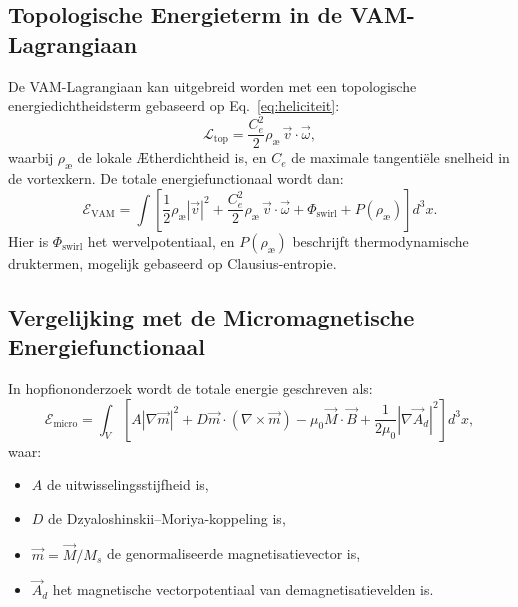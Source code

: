 \subsection{Topologische Energieterm in de VAM-Lagrangiaan}

De VAM-Lagrangiaan kan uitgebreid worden met een topologische energiedichtheidsterm gebaseerd op Eq.~\eqref{eq:heliciteit}:
\begin{equation}
    \mathcal{L}_\text{top} = \frac{C_e^2}{2} \rho_\text{\ae} \, \vec{v} \cdot \vec{\omega},
\end{equation}
waarbij $\rho_\text{\ae}$ de lokale Ætherdichtheid is, en $C_e$ de maximale tangentiële snelheid in de vortexkern. De totale energiefunctionaal wordt dan:
\begin{equation}
    \mathcal{E}_\text{VAM} = \int \left[
                                        \frac{1}{2} \rho_\text{\ae} |\vec{v}|^2
        + \frac{C_e^2}{2} \rho_\text{\ae} \, \vec{v} \cdot \vec{\omega}
                                        + \Phi_\text{swirl} + P(\rho_\text{\ae})
    \right] d^3x.
\end{equation}
Hier is $\Phi_\text{swirl}$ het wervelpotentiaal, en $P(\rho_\text{\ae})$ beschrijft thermodynamische druktermen, mogelijk gebaseerd op Clausius-entropie.

\subsection{Vergelijking met de Micromagnetische Energiefunctionaal}

In hopfiononderzoek wordt de totale energie geschreven als:
\begin{equation}
    \mathcal{E}_\text{micro} = \int_V \left[
                                            A |\nabla \vec{m}|^2 + D \vec{m} \cdot (\nabla \times \vec{m}) - \mu_0 \vec{M} \cdot \vec{B} + \frac{1}{2\mu_0} |\nabla \vec{A}_d|^2
    \right] d^3x,
\end{equation}
waar:
\begin{itemize}
    \item $A$ de uitwisselingsstijfheid is,
    \item $D$ de Dzyaloshinskii–Moriya-koppeling is,
    \item $\vec{m} = \vec{M}/M_s$ de genormaliseerde magnetisatievector is,
    \item $\vec{A}_d$ het magnetische vectorpotentiaal van demagnetisatievelden is.
\end{itemize}

